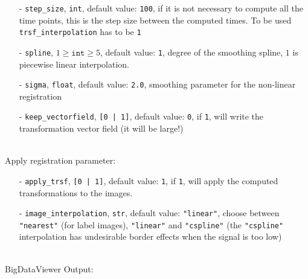 \documentclass[10pt,a4paper]{book}
\begin{document}
\begin{itemize}
\item[-] \texttt{step\_size}, \texttt{int}, default value: \texttt{100}, if it is not necessary to compute all the time points, this is the step size between the computed times. To be used \texttt{trsf\_interpolation} has to be \texttt{1}
\item[-] \texttt{spline}, $1\geq \texttt{int} \geq 5$, default value: \texttt{1}, degree of the smoothing spline, $1$ is piecewise linear interpolation.
\item[-] \texttt{sigma}, \texttt{float}, default value: \texttt{2.0}, smoothing parameter for the non-linear registration
\item[-] \texttt{keep\_vectorfield}, \texttt{[0 | 1]}, default value: \texttt{0}, if \texttt{1}, will write the transformation vector field (it will be large!)
\end{itemize}~\\
Apply registration parameter:
\begin{itemize}
\item[-] \texttt{apply\_trsf}, \texttt{[0 | 1]}, default value: \texttt{1}, if \texttt{1}, will apply the computed transformations to the images.
\item[-] \texttt{image\_interpolation}, \texttt{str}, default value: \texttt{"linear"}, choose between \texttt{"nearest"} (for label images), \texttt{"linear"} and \texttt{"cspline"} (the \texttt{"cspline"} interpolation has undesirable border effects when the signal is too low)
\end{itemize}~\\
BigDataViewer Output:
\end{document}
